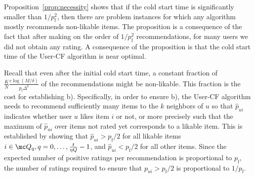 \documentclass{article}
\newcommand\pf{p_{\mathrm{f}}}
\newcommand{\vratingS}{\vocrating^{\text{sim}}}
\newcommand\vocrating{\vr}
\newcommand\ocR{R}
\newcommand{\setQ}{\mc Q}
\begin{document}
Proposition~\ref{prop:necessity} shows that if the cold start time is significantly smaller than $1/\pf^2$, then there are problem instances for which any algorithm mostly recommends non-likable items. 
The proposition is a consequence of the fact that after making on the order of $1/\pf^2$ recommendations, for many users we did not obtain any rating. 
A consequence of the proposition is that the cold start time of the User-CF algorithm is near optimal. 


Recall that even after the initial cold start time, a constant fraction of 
$\frac{K}{N} \frac{c \log(M/\delta)}{ \pf \Delta^2}$ of the recommendations might be non-likable. 
This fraction is the cost for establishing b). 
Specifically, in order to ensure b), the 
User-CF algorithm needs to recommend sufficiently many items to the $k$ neighbors of $u$ so that $\hat p_{ui}$ indicates whether user $u$ likes item $i$ or not, or more precisely such that the maximum of $\hat p_{ui}$ over items not rated yet corresponds to a likable item. 
This is established by showing that $\hat p_{ui} > \pf /2$ for all likable items $i \in \setQ_q, q=0,\ldots, \frac{t}{\eta Q}-1$, and $\hat p_{ui} < \pf /2$ for all other items. %
Since the expected number of positive ratings 
per recommendation is proportional to $\pf$, the number of ratings required to ensure that $p_{ui}>\pf/2$ is proportional to $1/\pf$. 

\end{document}
